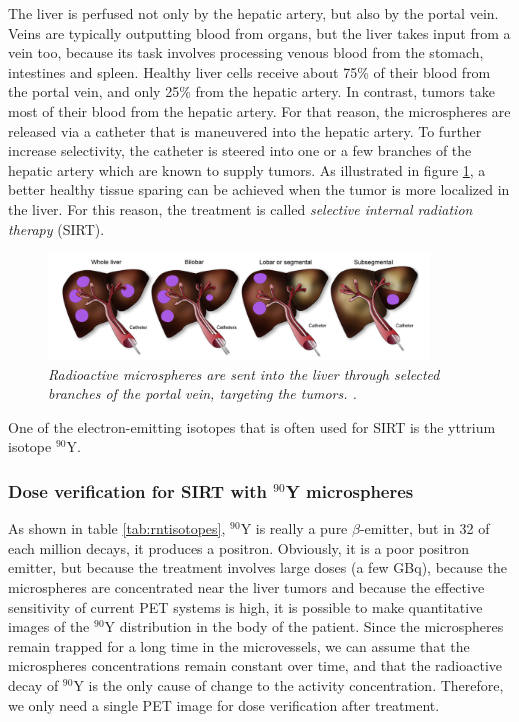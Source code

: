 The liver is perfused not only by the hepatic artery, but also by the
portal vein. Veins are typically outputting blood from organs, but the
liver takes input from a vein too, because its task involves
processing venous blood from the stomach, intestines and
spleen. Healthy liver cells receive about 75\% of their blood from the
portal vein, and only 25\% from the hepatic artery. In contrast,
tumors take most of their blood from the hepatic artery. For that
reason, the microspheres are released via a catheter that is
maneuvered into the hepatic artery. To further increase selectivity,
the catheter is steered into one or a few branches of the hepatic
artery which are known to supply tumors. As illustrated in figure
\ref{fig:Sangro}, a better healthy tissue sparing can be achieved when
the tumor is more localized in the liver. For this reason, the
treatment is called {\em selective internal radiation therapy} (SIRT).
\begin{figure}[tb]
\centering
\includegraphics[width=0.9\textwidth]{figs/fig_SIRT_Sangro.png}
\caption{\label{fig:Sangro} \emph{Radioactive microspheres are sent
    into the liver through selected branches of the portal vein, targeting
    the tumors. \cite{Sangro2012}.}}
\end{figure}
One of the electron-emitting isotopes that is often used for SIRT
is the yttrium isotope $^{90}$Y. 

\subsubsection{Dose verification for SIRT with $^{90}$Y microspheres}
As shown in table \ref{tab:rntisotopes}, $^{90}$Y is really a pure
$\beta$-emitter, but in 32 of each million decays, it produces a
positron. Obviously, it is a poor positron emitter, but because the
treatment involves large doses (a few GBq), because the microspheres
are concentrated near the liver tumors and because the effective
sensitivity of current PET systems is high, it is possible to make
quantitative images of the $^{90}$Y distribution in the body of the
patient. Since the microspheres remain trapped for a long time in the
microvessels, we can assume that the microspheres concentrations
remain constant over time, and that the radioactive decay of $^{90}$Y
is the only cause of change to the activity concentration. Therefore,
we only need a single PET image for dose verification after
treatment. 

